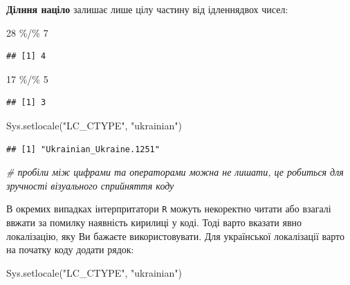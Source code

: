 \documentclass[
]{book}
\newenvironment{Shaded}{\begin{snugshade}}{\end{snugshade}}
\newcommand{\CommentTok}[1]{\textcolor[rgb]{0.56,0.35,0.01}{\textit{#1}}}
\newcommand{\DecValTok}[1]{\textcolor[rgb]{0.00,0.00,0.81}{#1}}
\newcommand{\FunctionTok}[1]{\textcolor[rgb]{0.00,0.00,0.00}{#1}}
\newcommand{\NormalTok}[1]{#1}
\newcommand{\SpecialCharTok}[1]{\textcolor[rgb]{0.00,0.00,0.00}{#1}}
\newcommand{\StringTok}[1]{\textcolor[rgb]{0.31,0.60,0.02}{#1}}
\begin{document}
\textbf{Ділння націло} залишає лише цілу частину від ідленнядвох чисел:

\begin{Shaded}
\begin{Highlighting}[]
\DecValTok{28} \SpecialCharTok{\%/\%} \DecValTok{7}
\end{Highlighting}
\end{Shaded}

\begin{verbatim}
## [1] 4
\end{verbatim}

\begin{Shaded}
\begin{Highlighting}[]
\DecValTok{17} \SpecialCharTok{\%/\%} \DecValTok{5} 
\end{Highlighting}
\end{Shaded}

\begin{verbatim}
## [1] 3
\end{verbatim}

\begin{Shaded}
\begin{Highlighting}[]
\FunctionTok{Sys.setlocale}\NormalTok{(}\StringTok{"LC\_CTYPE"}\NormalTok{, }\StringTok{"ukrainian"}\NormalTok{)}
\end{Highlighting}
\end{Shaded}

\begin{verbatim}
## [1] "Ukrainian_Ukraine.1251"
\end{verbatim}

\begin{Shaded}
\begin{Highlighting}[]
\CommentTok{\# пробіли між цифрами та операторами можна не лишати, це робиться для зручності візуального сприйняття коду}
\end{Highlighting}
\end{Shaded}

В окремих випадках інтерпритатори \texttt{R} можуть некоректно читати або взагалі ввжати за помилку наявність кирилиці у коді. Тоді варто вказати явно локалізацію, яку Ви бажаєте використовувати. Для української локалізації варто на початку коду додати рядок:

\begin{Shaded}
\begin{Highlighting}[]
\FunctionTok{Sys.setlocale}\NormalTok{(}\StringTok{"LC\_CTYPE"}\NormalTok{, }\StringTok{"ukrainian"}\NormalTok{)}
\end{Highlighting}
\end{Shaded}
\end{document}
